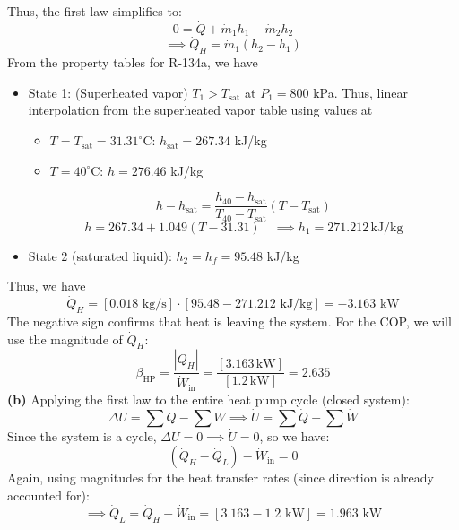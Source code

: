 \documentclass[12pt]{article}
\begin{document}
Thus, the first law simplifies to:
\[0 = \dot{Q} + \dot{m}_1h_1 -\dot{m}_2h_2\]
\[\implies \dot{Q}_H = \dot{m}_1(h_2 - h_1)\]
From the property tables for R-134a, we have
\begin{itemize}
    \item State 1: (Superheated vapor) $T_1 > T_{\text{sat}}$ at $P_1=800$ kPa. Thus, linear interpolation from the superheated vapor table using values at
    \begin{itemize}
        \item $T=T_{\text{sat}}=31.31^\circ$C: $h_{\text{sat}}=267.34$ kJ/kg
        \item $T=40^\circ$C: $h=276.46$ kJ/kg
    \end{itemize}
    \[h-h_{\text{sat}} = \frac{h_{40} - h_{\text{sat}}}{T_{40} - T_{\text{sat}}} (T - T_{\text{sat}})\]
    \[h=267.34 +1.049(T - 31.31)\quad\implies h_1 =271.212 \,\text{kJ/kg}\]
    \item State 2 (saturated liquid): $h_2 = h_f = 95.48$ kJ/kg
\end{itemize}
Thus, we have
\[\dot{Q}_H = [0.018 \text{ kg/s}] \cdot [95.48 - 271.212 \text{ kJ/kg}] = -3.163 \text{ kW}\]
The negative sign confirms that heat is leaving the system. For the COP, we will use the magnitude of $\dot{Q}_H$:
\[\beta_{\text{HP}} = \frac{|\dot{Q}_H|}{\dot{W}_{\text{in}}} = \frac{[3.163\,\text{kW}]}{[1.2\,\text{kW}]} = \boxed{2.635}\]
\textbf{(b)} Applying the first law to the entire heat pump cycle (closed system):
\[\Delta U = \sum Q - \sum W \implies \dot{U} = \sum \dot{Q} - \sum \dot{W}\]
Since the system is a cycle, $\Delta U = 0 \implies \dot{U} = 0$, so we have:
\[(\dot{Q}_H - \dot{Q}_L) - \dot{W}_{\text{in}} = 0\]
Again, using magnitudes for the heat transfer rates (since direction is already accounted for):
\[\implies \dot{Q}_L = \dot{Q}_H - \dot{W}_{\text{in}} = [3.163 - 1.2 \text{ kW}] = \boxed{1.963 \text{ kW}}\]
\end{document}

